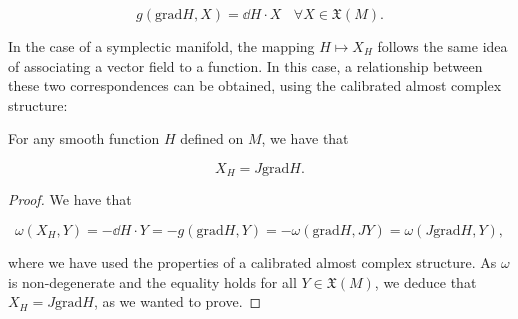 $$g(\text{grad}H, X) = \dd H \cdot X \ \ \ \ \forall X \in \mathfrak{X}(M) .$$

In the case of a symplectic manifold, the mapping $H \mapsto X_H$ follows the same idea of associating a vector field to a function. In this case, a relationship between these two correspondences can be obtained, using the calibrated almost complex structure:

\begin{prop} \label{prop:symplectic_gradient}
For any smooth function $H$ defined on $M$, we have that

$$X_H = J \text{grad}H .$$
\end{prop}

\begin{proof}
We have that

$$\omega(X_H,Y) = - \dd H \cdot Y = - g(\text{grad}H,Y) = - \omega(\text{grad}H,JY) = \omega(J \text{grad}H, Y) ,$$

where we have used the properties of a calibrated almost complex structure. As $\omega$ is non-degenerate and the equality holds for all $Y \in \mathfrak{X}(M)$, we deduce that $X_H = J \text{grad}H$, as we wanted to prove.
\end{proof}
